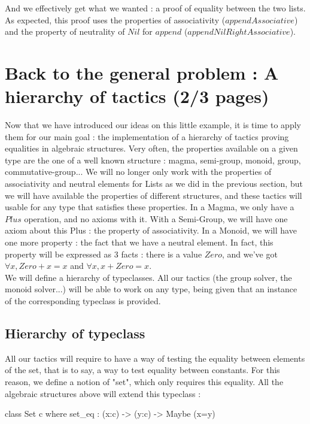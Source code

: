 \documentclass{sigplanconf}
\begin{document}
And we effectively get what we wanted : a proof of equality between the two lists. As expected, this proof uses the properties of associativity ($appendAssociative$) and the property of neutrality of $Nil$ for $append$ ($appendNilRightAssociative$).

\section {Back to the general problem : A hierarchy of tactics (2/3 pages)}

Now that we have introduced our ideas on this little example, it is time to apply them for our main goal : the implementation of a hierarchy of tactics proving equalities in algebraic structures. Very often, the properties available on a given type are the one of a well known structure : magma, semi-group, monoid, group, commutative-group...  We will no longer only work with the properties of associativity and neutral elements for Lists as we did in the previous section, but we will have available the properties of different structures, and these tactics will usable for any type that satisfies these properties.
In a Magma, we only have a $Plus$ operation, and no axioms with it. With a Semi-Group, we will have one axiom about this Plus : the property of associativity. In a Monoid, we will have one more property : the fact that we have a neutral element. In fact, this property will be expressed as 3 facts : there is a value $Zero$, and we've got $\forall x, Zero + x = x$ and $\forall x, x + Zero = x$. \\

We will define a hierarchy of typeclasses. All our tactics (the group solver, the monoid solver...) will be able to work on any type, being given that an instance of the corresponding typeclass is provided.

\subsection {Hierarchy of typeclass}

All our tactics will require to have a way of testing the equality between elements of the set, that is to say, a way to test equality between constants. For this reason, we define a notion of "set", which only requires this equality. All the algebraic structures above will extend this typeclass :

\begin{code}[caption=Set, captionpos=b, label=lst1:haskell2]
class Set c where
    set_eq : (x:c) -> (y:c) -> Maybe (x=y)
\end{code}
\end{document}
